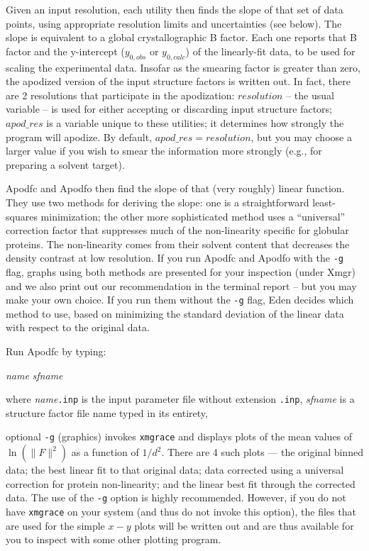 \documentclass{report}
\begin{document}
{Given an input resolution,
each utility then finds the slope of that set of data points, 
using appropriate resolution limits and uncertainties (see below).  
The slope is equivalent to a global crystallographic B factor.
Each one reports that B factor and the y-intercept 
($y_{0,obs}$ or $y_{0,calc}$) of the
linearly-fit data, to be used for scaling the experimental data.
Insofar as the smearing factor is greater than zero, the apodized version
of the input structure factors is written out.
In fact, there are 2 resolutions that participate in the apodization: 
$resolution$ -- the usual variable -- is used for either accepting or discarding
input structure factors; $apod\_res$ is a variable unique to these utilities;
it determines how strongly the program will apodize.  
By default, $apod\_res = resolution$, but you may choose a larger
value if you wish to smear the information more strongly (e.g., for 
preparing a solvent target).

\vspace {0.1in}

Apodfc and Apodfo then find the slope of that (very roughly) linear function.
They use two methods for deriving the slope: one is a straightforward least-squares
 minimization; the other more sophisticated method uses a ``universal'' 
correction factor \cite{cowtan} that suppresses much of the non-linearity
specific for globular proteins.  The non-linearity comes from their
solvent content that decreases the density contrast at low resolution.
If you run Apodfc and Apodfo with the {\tt -g} flag,
graphs using both methods are presented for your inspection (under Xmgr) and 
we also print out our recommendation in the terminal report -- but you may make
your own choice.
If you run them without the {\tt -g} flag, Eden decides which method to use, 
based on minimizing the standard deviation of the linear data with respect to 
the original data.

Run Apodfc by typing:

 {\it name} {\it sfname}

where 
{\it name}{\tt .inp} is the input parameter file without extension {\tt .inp},
{\it sfname} is a structure factor file name typed in its entirety,

\qq optional {\tt -g} (graphics) invokes 
{\tt xmgrace} and displays plots of the
mean values of $\ln(\|F\|^2)$ as a function of $1/d^2$.  There are 4 such plots 
--- the original binned data; the best linear fit to that original data;
data corrected using a universal correction for protein non-linearity;
and the linear best fit through the corrected data.  The use of the {\tt -g}
option is highly recommended.  However, if you do not have {\tt xmgrace} on your
system (and thus do not invoke this option), the files that are used for the
simple $x-y$ plots will be written out and are thus available for you to inspect
with some other plotting program.

}
\end{document}
